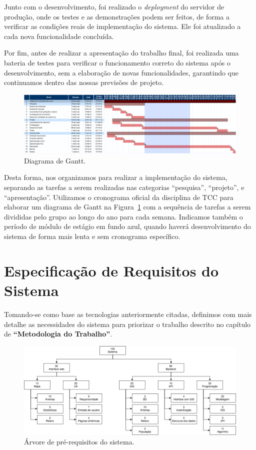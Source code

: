 \documentclass[]{politex}
\begin{document}
Junto com o desenvolvimento, foi realizado o \textit{deployment} do servidor de
produção, onde os testes e as demonstrações podem ser feitos, de forma a
verificar as condições reais de implementação do sistema. Ele foi atualizado a
cada nova funcionalidade concluída.

Por fim, antes de realizar a apresentação do trabalho final, foi realizada uma
bateria de testes para verificar o funcionamento correto do sistema após o
desenvolvimento, sem a elaboração de novas funcionalidades, garantindo que
continuamos dentro das nossas previsões de projeto.

\begin{figure}[H]
    \centering
    \includegraphics[width=6.5in]{imagens/diagrama_gantt}
    \caption{Diagrama de Gantt.}
    \label{fig:gantt}
\end{figure}

Desta forma, nos organizamos para realizar a implementação do sistema, separando
as tarefas a serem realizadas nas categorias ``pesquisa'', ``projeto'', e
``apresentação''. Utilizamos o cronograma oficial da disciplina de TCC para
elaborar um diagrama de Gantt na Figura~\ref{fig:gantt} com a sequência de
tarefas a serem divididas pelo grupo ao longo do ano para cada semana. Indicamos
também o período de módulo de estágio em fundo azul, quando haverá
desenvolvimento do sistema de forma mais lenta e sem cronograma específico.

\chapter{Especificação de Requisitos do Sistema}

Tomando-se como base as tecnologias anteriormente citadas, definimos com mais
detalhe as necessidades do sistema para priorizar o trabalho descrito no
capítulo de \textbf{``Metodologia do Trabalho''}.

\begin{figure}[H]
    \centering
    \includegraphics[width=6in]{imagens/arvore_prerequisitos}
    \caption{Árvore de pré-requisitos do sistema.}
    \label{fig:arvore_prerequisitos}
\end{figure}
\end{document}
